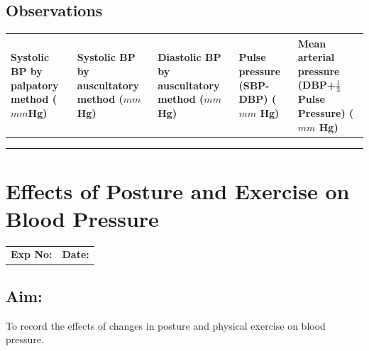 \documentclass[a4paper,12pt]{book}
\begin{document}
\section*{Observations}
\begin{table}[H]

		\setlength\extrarowheight{10pt}
	\begin{tabular}{|p{1.1in}|p{1.1in}|p{1.1in}|p{1.1in}|p{1.1in}|}
		\hline
		Systolic BP by palpatory method ($mm$Hg) & Systolic BP by auscultatory method ($mm$Hg) & Diastolic BP by auscultatory method ($mm$ Hg) & Pulse pressure (SBP-DBP) ($mm$ Hg) & Mean arterial pressure (DBP+${\frac{1}{3}}$ Pulse Pressure) ($mm$ Hg) \\ \hline
			                                         &                                             &                                               &                                                                              &                                                                                                               \\ \hline
								                                          &                                             &                                               &                                                                              &                                                                                                               \\ \hline
													                                           &                                             &                                               &                                                                              &                                                                                                               \\ \hline
	\end{tabular}
\end{table}
															\chapter*{\centering Effects of Posture and Exercise on	Blood Pressure}
															\begin{tabular}{p{5in} p{1in}}
																\textbf{Exp No:}  & \textbf{Date:}\\
															\end{tabular}
\section*{Aim:}
	To record the effects of changes in posture and physical exercise on blood pressure.
\end{document}
